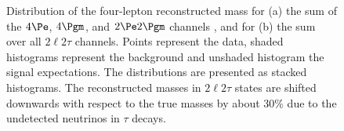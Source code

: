 \begin{figure}[htbp]
\begin{center}
%
%
\caption{ 
Distribution of the four-lepton reconstructed mass for (a) the sum of 
the $4\Pe$, $4\Pgm$, and $2\Pe2\Pgm$ channels , and for (b) the sum over all
$2\ell2\tau$ channels.
Points represent the data, shaded histograms represent the background 
and unshaded histogram the signal expectations.
The distributions are presented as stacked histograms. 
The reconstructed masses in $2\ell2\tau$ states
are shifted downwards with respect to the true masses by about 
30\% due to the
undetected neutrinos in $\tau$ decays.
}
\label{fig:Mass4l-2l2tau}
\end{center}
\end{figure}

